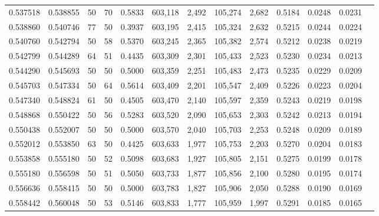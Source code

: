 \begin{tabular}{rrrrrrrrrrrrr}
0.537518 & 0.538855 &    50 &  70 &                                     0.5833 & 603,118 &   2,492 & 105,274 &   2,682 & 0.5184 & 0.0248 & 0.0231 \\
0.538860 & 0.540746 &    77 &  50 &                                     0.3937 & 603,195 &   2,415 & 105,324 &   2,632 & 0.5215 & 0.0244 & 0.0224 \\
0.540760 & 0.542794 &    50 &  58 &                                     0.5370 & 603,245 &   2,365 & 105,382 &   2,574 & 0.5212 & 0.0238 & 0.0219 \\
0.542799 & 0.544289 &    64 &  51 &                                     0.4435 & 603,309 &   2,301 & 105,433 &   2,523 & 0.5230 & 0.0234 & 0.0213 \\
0.544290 & 0.545693 &    50 &  50 &                                     0.5000 & 603,359 &   2,251 & 105,483 &   2,473 & 0.5235 & 0.0229 & 0.0209 \\
0.545703 & 0.547334 &    50 &  64 &                                     0.5614 & 603,409 &   2,201 & 105,547 &   2,409 & 0.5226 & 0.0223 & 0.0204 \\
0.547340 & 0.548824 &    61 &  50 &                                     0.4505 & 603,470 &   2,140 & 105,597 &   2,359 & 0.5243 & 0.0219 & 0.0198 \\
0.548868 & 0.550422 &    50 &  56 &                                     0.5283 & 603,520 &   2,090 & 105,653 &   2,303 & 0.5242 & 0.0213 & 0.0194 \\
0.550438 & 0.552007 &    50 &  50 &                                     0.5000 & 603,570 &   2,040 & 105,703 &   2,253 & 0.5248 & 0.0209 & 0.0189 \\
0.552012 & 0.553850 &    63 &  50 &                                     0.4425 & 603,633 &   1,977 & 105,753 &   2,203 & 0.5270 & 0.0204 & 0.0183 \\
0.553858 & 0.555180 &    50 &  52 &                                     0.5098 & 603,683 &   1,927 & 105,805 &   2,151 & 0.5275 & 0.0199 & 0.0178 \\
0.555180 & 0.556598 &    50 &  51 &                                     0.5050 & 603,733 &   1,877 & 105,856 &   2,100 & 0.5280 & 0.0195 & 0.0174 \\
0.556636 & 0.558415 &    50 &  50 &                                     0.5000 & 603,783 &   1,827 & 105,906 &   2,050 & 0.5288 & 0.0190 & 0.0169 \\
0.558442 & 0.560048 &    50 &  53 &                                     0.5146 & 603,833 &   1,777 & 105,959 &   1,997 & 0.5291 & 0.0185 & 0.0165 \\

\end{tabular}
